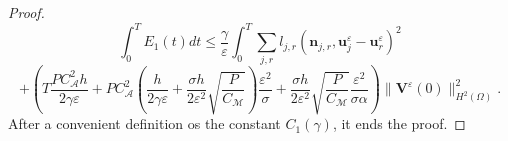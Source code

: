 \documentclass[a4paper,french,english,10pt]{article}
\newcommand\eps{\varepsilon}
\begin{document}
\begin{proof}
\begin{equation}
\int_0^T E_1(t)dt \leq 
\frac{\gamma}{\eps}\int_0^T\sum_{j,r}l_{j,r}(\textbf{n}_{j,r},\textbf{u}_j^{\eps}-\textbf{u}
_r^{\eps})^2 
\end{equation}
$$
+
  \left(T \frac {P C_{\mathcal A}^2 h }{2\gamma \eps}+
  P C_{\mathcal A}^2 \left( \frac{h}{2 \gamma \eps} + \frac{\sigma h }{2\eps^2}\sqrt{\frac{P}{C_\mathcal M}}  \right)
  \frac{\varepsilon^2}{\sigma}
 +
 \frac{\sigma h  }{2\eps^2}\sqrt{\frac{P}{C_\mathcal M}} 
   \frac{\varepsilon^2}{\sigma \alpha}
     \right)
  \| \mathbf{V}^{\eps}(0) \|_{H^2(\Omega)}^2 .
$$
After a convenient definition os the  constant $C_1(\gamma)$, 
it ends the proof. 
\end{proof}


\end{document}
